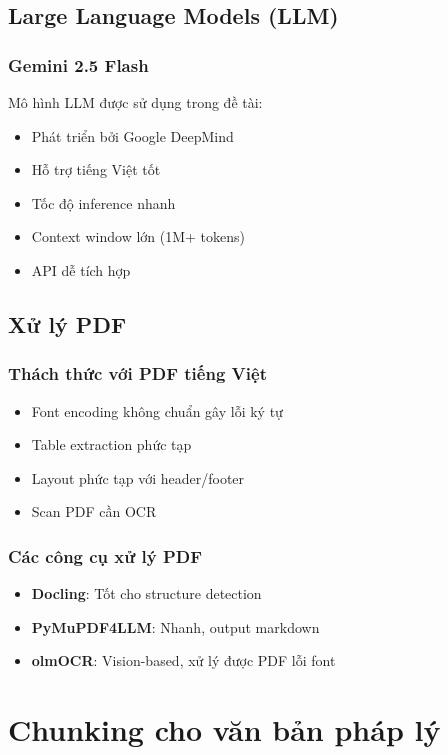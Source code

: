 \documentclass[../DoAn.tex]{subfiles}
\begin{document}
\subsection{Large Language Models (LLM)}

\subsubsection{Gemini 2.5 Flash}
Mô hình LLM được sử dụng trong đề tài:
\begin{itemize}
    \item Phát triển bởi Google DeepMind
    \item Hỗ trợ tiếng Việt tốt
    \item Tốc độ inference nhanh
    \item Context window lớn (1M+ tokens)
    \item API dễ tích hợp
\end{itemize}

\subsection{Xử lý PDF}

\subsubsection{Thách thức với PDF tiếng Việt}
\begin{itemize}
    \item Font encoding không chuẩn gây lỗi ký tự
    \item Table extraction phức tạp
    \item Layout phức tạp với header/footer
    \item Scan PDF cần OCR
\end{itemize}

\subsubsection{Các công cụ xử lý PDF}
\begin{itemize}
    \item \textbf{Docling}: Tốt cho structure detection
    \item \textbf{PyMuPDF4LLM}: Nhanh, output markdown
    \item \textbf{olmOCR}: Vision-based, xử lý được PDF lỗi font
\end{itemize}

\section{Chunking cho văn bản pháp lý}
\end{document}
